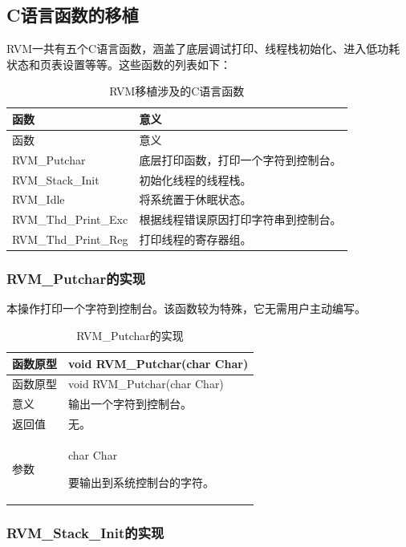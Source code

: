 \subsection{C语言函数的移植}\label{subsec:8-2-7}

RVM一共有五个C语言函数，涵盖了底层调试打印、线程栈初始化、进入低功耗状态和页表设置等等。这些函数的列表如下：

\begin{xltabular}{\textwidth}{@{}>{\hsize\raggedright\arraybackslash}X>{\hsize\raggedright\arraybackslash}X@{}}
\caption{RVM移植涉及的C语言函数}\label{tab:8-13}\\
\toprule
函数 & 意义\tabularnewline
\endfirsthead
\toprule
函数 & 意义\tabularnewline
\midrule
\endhead
\bottomrule
\endlastfoot
RVM\_\allowbreak{}Putchar & 底层打印函数，打印一个字符到控制台。\tabularnewline
RVM\_\allowbreak{}Stack\_\allowbreak{}Init & 初始化线程的线程栈。\tabularnewline
RVM\_\allowbreak{}Idle & 将系统置于休眠状态。\tabularnewline
RVM\_\allowbreak{}Thd\_\allowbreak{}Print\_\allowbreak{}Exc &
根据线程错误原因打印字符串到控制台。\tabularnewline
RVM\_\allowbreak{}Thd\_\allowbreak{}Print\_\allowbreak{}Reg & 打印线程的寄存器组。\tabularnewline
\end{xltabular}

\subsubsection{RVM\_Putchar的实现}\label{subsubsec:8-2-7-1}

本操作打印一个字符到控制台。该函数较为特殊，它无需用户主动编写。

\begin{xltabular}{\textwidth}{@{}>{\hsize\raggedright\arraybackslash}X>{\hsize\raggedright\arraybackslash}X@{}}
\caption{RVM\_\allowbreak{}Putchar的实现}\label{tab:8-14}\\
\toprule
函数原型 & void RVM\_\allowbreak{}Putchar(char Char)\tabularnewline
\endfirsthead
\toprule
函数原型 & void RVM\_\allowbreak{}Putchar(char Char)\tabularnewline
\midrule
\endhead
\bottomrule
\endlastfoot
意义 & 输出一个字符到控制台。\tabularnewline
返回值 & 无。\tabularnewline
参数\strut
 & char Char

要输出到系统控制台的字符。\strut
\tabularnewline
\end{xltabular}

\subsubsection{RVM\_Stack\_Init的实现}\label{subsubsec:8-2-7-2}

